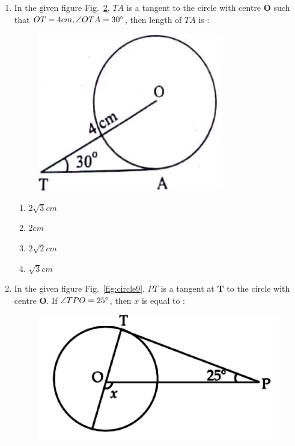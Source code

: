 \documentclass{article}
\let\vec\mathbf
\newcommand\figref{Fig.~\ref}
\begin{document}
\begin{enumerate}
\begin{figure}[H]
			\caption{}
			\label{fig:circle7}
		\end{figure}
	\item In the given figure \figref{fig:circle8}, $ TA $ is a tangent to the circle with centre $ \vec{O} $ such that $ OT = 4 cm , \angle{OTA} = 30{\degree} $, then length of $ TA $ is :
		\begin{figure}[H]
			\centering
			\includegraphics[width=\columnwidth]{fig9.jpg}
			\caption{}
			\label{fig:circle8}
		\end{figure}
		\begin{enumerate}
			\item $ 2\sqrt{3} cm $
			\item $ 2 cm $
			\item $ 2\sqrt{2} cm $
			\item $ \sqrt{3} cm $
		\end{enumerate}
	\item In the given figure \figref{fig:circle9}, $ PT $ is a tangent at $ \vec{T} $ to the circle with centre $ \vec{O} $. If $ \angle{TPO} = 25{\degree} $, then $ x $ is equal to : 
		\begin{figure}[H]
			\centering
			\includegraphics[width=\columnwidth]{fig10.jpg}

\end{figure}
\end{enumerate}
\end{document}
